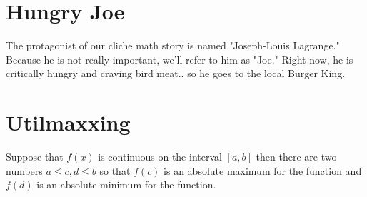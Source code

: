 
\setcounter{chapter}{0}
\chapter{Hungry Joe}
The protagonist of our cliche math story is named "Joseph-Louis Lagrange."
 Because he is not really important, we'll refer to him as "Joe."
 Right now, he is critically hungry and craving bird meat.. so he goes to the local Burger King.


\setcounter{chapter}{1}
\chapter{Utilmaxxing}

\begin{theorem}
	Suppose that \(f\left( x \right)\) is continuous on the interval \(\left[ {a,b} \right]\) then there are two numbers \(a \le c,d \le b\) so that \(f\left( c \right)\) is an absolute maximum for the function and \(f\left( d \right)\) is an absolute minimum for the function.
\end{theorem}